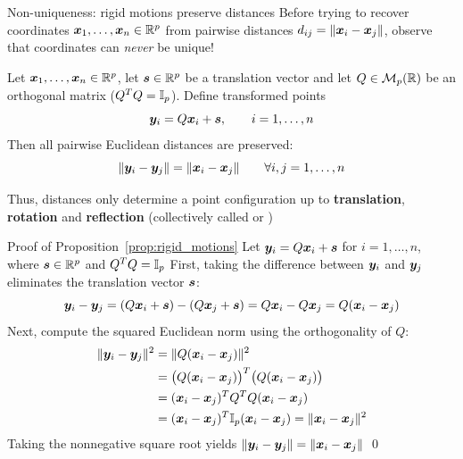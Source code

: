 \documentclass[aspectratio=169]{beamer}\usepackage[]{graphicx}\usepackage[]{xcolor}
\begin{document}
\begin{frame}{Non-uniqueness: rigid motions preserve distances}
Before trying to recover coordinates $\bm{x}_1,\ldots,\bm{x}_n\in\mathbb{R}^p$ from pairwise distances $d_{ij} = \|\bm{x}_i - \bm{x}_j\|$, observe that coordinates can \emph{never} be unique!
\vfill
\begin{importantproposition}
\label{prop:rigid_motions}
Let $\bm{x}_1,\ldots,\bm{x}_n\in\mathbb{R}^p$, let $\bm{s}\in\mathbb{R}^p$ be a translation vector and let $Q\in\mathcal{M}_p(\mathbb{R})$ be an orthogonal matrix ($Q^TQ = \mathbb{I}_p$). Define transformed points
\[
\bm{y}_i = Q\bm{x}_i + \bm{s}, \qquad i=1,\ldots,n
\]
Then all pairwise Euclidean distances are preserved:
\[
\|\bm{y}_i - \bm{y}_j\| = \|\bm{x}_i - \bm{x}_j\| \qquad \forall i,j=1,\ldots,n
\]
\end{importantproposition}
\vfill
Thus, distances only determine a point configuration up to \textbf{translation}, \textbf{rotation} and \textbf{reflection} (collectively called  or )
\end{frame}

\begin{frame}[importantcolour]{Proof of Proposition~\ref{prop:rigid_motions}}
Let $\bm{y}_i = Q\bm{x}_i + \bm{s}$ for $i=1,\ldots,n$, where $\bm{s}\in\mathbb{R}^p$ and $Q^TQ = \mathbb{I}_p$
\vfill
First, taking the difference between $\bm{y}_i$ and $\bm{y}_j$ eliminates the translation vector $\bm{s}$:
\[
\bm{y}_i - \bm{y}_j = (Q\bm{x}_i + \bm{s}) - (Q\bm{x}_j + \bm{s}) = Q\bm{x}_i - Q\bm{x}_j = Q(\bm{x}_i - \bm{x}_j)
\]
\vfill
Next, compute the squared Euclidean norm using the orthogonality of $Q$:
\begin{align*}
\|\bm{y}_i - \bm{y}_j\|^2 &= \|Q(\bm{x}_i - \bm{x}_j)\|^2 \\
&= \big(Q(\bm{x}_i - \bm{x}_j)\big)^T \big(Q(\bm{x}_i - \bm{x}_j)\big) \\
&= (\bm{x}_i - \bm{x}_j)^T Q^T Q (\bm{x}_i - \bm{x}_j) \\
&= (\bm{x}_i - \bm{x}_j)^T \mathbb{I}_p (\bm{x}_i - \bm{x}_j) = \|\bm{x}_i - \bm{x}_j\|^2
\end{align*}
Taking the nonnegative square root yields $\|\bm{y}_i - \bm{y}_j\| = \|\bm{x}_i - \bm{x}_j\|$ \hfill\qed
\end{frame}
\end{document}
